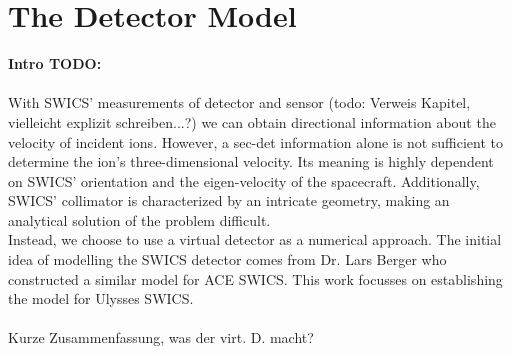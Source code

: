 \section{The Detector Model}

\textbf{Intro TODO:} \\ \\
With SWICS' measurements of detector and sensor (todo: Verweis Kapitel, vielleicht explizit schreiben...?) we can obtain directional information about the velocity of incident ions. However, a sec-det information alone is not sufficient to determine the ion's three-dimensional velocity. Its meaning is highly dependent on SWICS' orientation and the eigen-velocity of the spacecraft. Additionally, SWICS' collimator is characterized by an intricate geometry, making an analytical solution of the problem difficult. \\
Instead, we choose to use a virtual detector as a numerical approach. The initial idea of modelling the SWICS detector comes from Dr. Lars Berger who constructed a similar model for ACE SWICS. This work focusses on establishing the model for Ulysses SWICS.\\ \\
Kurze Zusammenfassung, was der virt. D. macht?



